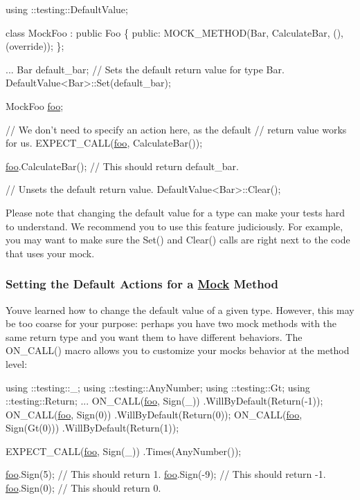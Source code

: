 \begin{DoxyCode}
using ::testing::DefaultValue;

\textcolor{keyword}{class }MockFoo : \textcolor{keyword}{public} Foo \{
 \textcolor{keyword}{public}:
  MOCK\_METHOD(Bar, CalculateBar, (), (\textcolor{keyword}{override}));
\};


...
  Bar default\_bar;
  \textcolor{comment}{// Sets the default return value for type Bar.}
  DefaultValue<Bar>::Set(default\_bar);

  MockFoo \mbox{\hyperlink{namespacefoo}{foo}};

  \textcolor{comment}{// We don't need to specify an action here, as the default}
  \textcolor{comment}{// return value works for us.}
  EXPECT\_CALL(\mbox{\hyperlink{namespacefoo}{foo}}, CalculateBar());

  \mbox{\hyperlink{namespacefoo}{foo}}.CalculateBar();  \textcolor{comment}{// This should return default\_bar.}

  \textcolor{comment}{// Unsets the default return value.}
  DefaultValue<Bar>::Clear();
\end{DoxyCode}


Please note that changing the default value for a type can make your tests hard to understand. We recommend you to use this feature judiciously. For example, you may want to make sure the {\ttfamily Set()} and {\ttfamily Clear()} calls are right next to the code that uses your mock.

\subsubsection*{Setting the Default Actions for a \mbox{\hyperlink{classMock}{Mock}} Method}

You\textquotesingle{}ve learned how to change the default value of a given type. However, this may be too coarse for your purpose\+: perhaps you have two mock methods with the same return type and you want them to have different behaviors. The {\ttfamily O\+N\+\_\+\+C\+A\+L\+L()} macro allows you to customize your mock\textquotesingle{}s behavior at the method level\+:


\begin{DoxyCode}
using ::testing::\_;
using ::testing::AnyNumber;
using ::testing::Gt;
using ::testing::Return;
...
  ON\_CALL(\mbox{\hyperlink{namespacefoo}{foo}}, Sign(\_))
      .WillByDefault(Return(-1));
  ON\_CALL(\mbox{\hyperlink{namespacefoo}{foo}}, Sign(0))
      .WillByDefault(Return(0));
  ON\_CALL(\mbox{\hyperlink{namespacefoo}{foo}}, Sign(Gt(0)))
      .WillByDefault(Return(1));

  EXPECT\_CALL(\mbox{\hyperlink{namespacefoo}{foo}}, Sign(\_))
      .Times(AnyNumber());

  \mbox{\hyperlink{namespacefoo}{foo}}.Sign(5);   \textcolor{comment}{// This should return 1.}
  \mbox{\hyperlink{namespacefoo}{foo}}.Sign(-9);  \textcolor{comment}{// This should return -1.}
  \mbox{\hyperlink{namespacefoo}{foo}}.Sign(0);   \textcolor{comment}{// This should return 0.}
\end{DoxyCode}


